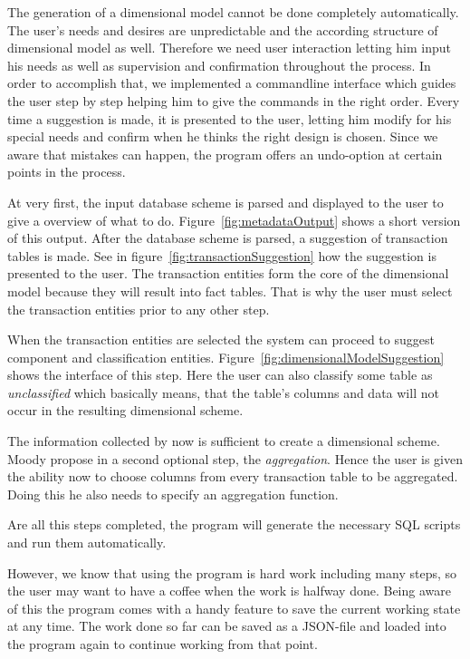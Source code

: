 The generation of a dimensional model cannot be done completely automatically.
The user's needs and desires are unpredictable and the according structure of dimensional model as well.
Therefore we need user interaction letting him input his needs as well as supervision and confirmation throughout the process.
In order to accomplish that, we implemented a commandline interface which guides the user step by step helping him to give the commands in the right order.
Every time a suggestion is made, it is presented to the user, letting him modify for his special needs and confirm when he thinks the right design is chosen.
Since we aware that mistakes can happen, the program offers an undo-option at certain points in the process.

At very first, the input database scheme is parsed and displayed to the user to give a overview of what to do. Figure~\ref{fig:metadataOutput} shows a short version of this output.
After the database scheme is parsed, a suggestion of transaction tables is made.
See in figure~\ref{fig:transactionSuggestion} how the suggestion is presented to the user.
The transaction entities form the core of the dimensional model because they will result into fact tables.
That is why the user must select the transaction entities prior to any other step.

When the transaction entities are selected the system can proceed to suggest component and classification entities.
Figure~\ref{fig:dimensionalModelSuggestion} shows the interface of this step. Here the user can also classify some table as \emph{unclassified} which basically means, that the table's columns and data will not occur in the resulting dimensional scheme.

The information collected by now is sufficient to create a dimensional scheme.
Moody \andothers propose in \cite{moody2000enterprise} a second optional step, the \emph{aggregation}.
Hence the user is given the ability now to choose columns from every transaction table to be aggregated.
Doing this he also needs to specify an aggregation function.

Are all this steps completed, the program will generate the necessary SQL scripts and run them automatically.

However, we know that using the program is hard work including many steps, so the user may want to have a coffee when the work is halfway done.
Being aware of this the program comes with a handy feature to save the current working state at any time.
The work done so far can be saved as a JSON-file and loaded into the program again to continue working from that point.

